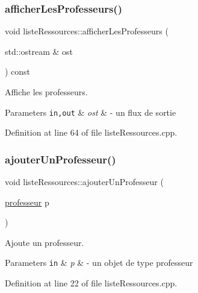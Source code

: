 \subsubsection{\texorpdfstring{afficher\+Les\+Professeurs()}{afficherLesProfesseurs()}}
{\footnotesize\ttfamily void liste\+Ressources\+::afficher\+Les\+Professeurs (\begin{DoxyParamCaption}\item[{std\+::ostream \&}]{ost }\end{DoxyParamCaption}) const}



Affiche les professeurs. 


\begin{DoxyParams}[1]{Parameters}
\mbox{\tt in,out}  & {\em ost} & -\/ un flux de sortie \\
\hline
\end{DoxyParams}


Definition at line 64 of file liste\+Ressources.\+cpp.

\hypertarget{classliste_ressources_afb8d1bb96971684ed945622b462fcd5d}{}\label{classliste_ressources_afb8d1bb96971684ed945622b462fcd5d} 
\subsubsection{\texorpdfstring{ajouter\+Un\+Professeur()}{ajouterUnProfesseur()}}
{\footnotesize\ttfamily void liste\+Ressources\+::ajouter\+Un\+Professeur (\begin{DoxyParamCaption}\item[{\hyperlink{classprofesseur}{professeur}}]{p }\end{DoxyParamCaption})}



Ajoute un professeur. 


\begin{DoxyParams}[1]{Parameters}
\mbox{\tt in}  & {\em p} & -\/ un objet de type professeur \\
\hline
\end{DoxyParams}


Definition at line 22 of file liste\+Ressources.\+cpp.

\hypertarget{classliste_ressources_a9b496a36a9651347734d7895397dde00}{}\label{classliste_ressources_a9b496a36a9651347734d7895397dde00} 
